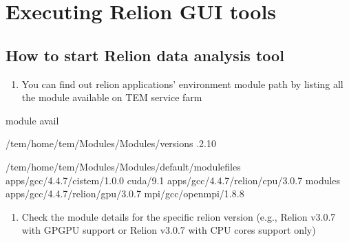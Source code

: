 \documentclass[letterpaper,10pt,english]{sphinxmanual}
\begin{document}
\section{Executing Relion GUI tools}
\label{\detokenize{relion:executing-relion-gui-tools}}

\subsection{How to start Relion data analysis tool}
\label{\detokenize{relion:how-to-start-relion-data-analysis-tool}}\begin{enumerate}
\def\theenumi{\arabic{enumi}}
\def\labelenumi{\theenumi .}
\makeatletter\def\p@enumii{\p@enumi \theenumi .}\makeatother
\item {} 
You can find out relion applications’ environment module path by listing all the module available on TEM service farm

\end{enumerate}

\begin{sphinxVerbatim}[commandchars=\\\{\}]
\PYGZdl{}\PYGZgt{} module avail

\PYGZhy{}\PYGZhy{}\PYGZhy{}\PYGZhy{}\PYGZhy{}\PYGZhy{}\PYGZhy{}\PYGZhy{}\PYGZhy{}\PYGZhy{}\PYGZhy{}\PYGZhy{}\PYGZhy{}\PYGZhy{}\PYGZhy{}\PYGZhy{}\PYGZhy{} /tem/home/tem/Modules/Modules/versions \PYGZhy{}\PYGZhy{}\PYGZhy{}\PYGZhy{}\PYGZhy{}\PYGZhy{}\PYGZhy{}\PYGZhy{}\PYGZhy{}\PYGZhy{}\PYGZhy{}\PYGZhy{}\PYGZhy{}\PYGZhy{}\PYGZhy{}\PYGZhy{}\PYGZhy{}
.2.10

\PYGZhy{}\PYGZhy{}\PYGZhy{}\PYGZhy{}\PYGZhy{}\PYGZhy{}\PYGZhy{}\PYGZhy{}\PYGZhy{}\PYGZhy{}\PYGZhy{} /tem/home/tem/Modules/Modules/default/modulefiles \PYGZhy{}\PYGZhy{}\PYGZhy{}\PYGZhy{}\PYGZhy{}\PYGZhy{}\PYGZhy{}\PYGZhy{}\PYGZhy{}\PYGZhy{}\PYGZhy{}\PYGZhy{}
apps/gcc/4.4.7/cistem/1.0.0     cuda/9.1
apps/gcc/4.4.7/relion/cpu/3.0.7 modules
apps/gcc/4.4.7/relion/gpu/3.0.7 mpi/gcc/openmpi/1.8.8
\end{sphinxVerbatim}
\begin{enumerate}
\def\theenumi{\arabic{enumi}}
\def\labelenumi{\theenumi .}
\makeatletter\def\p@enumii{\p@enumi \theenumi .}\makeatother
\setcounter{enumi}{1}
\item {} 
Check the module details for the specific relion version (e.g., Relion v3.0.7 with GPGPU support or Relion v3.0.7 with CPU cores support only)

\end{enumerate}
\end{document}
